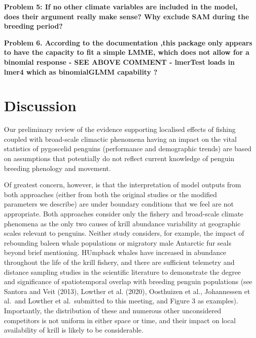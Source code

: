 \documentclass[]{elsarticle} %
\begin{document}
\textbf{Problem 5: If no other climate variables are included in the
model, does their argument really make sense? Why exclude SAM during the
breeding period?}

\textbf{Problem 6. According to the documentation ,this package only
appears to have the capacity to fit a simple LMME, which does not allow
for a binomial response - SEE ABOVE COMMENT - lmerTest loads in lmer4
which as binomialGLMM capability ?}

\hypertarget{discussion}{%
\section{Discussion}\label{discussion}}

Our preliminary review of the evidence supporting localised effects of
fishing coupled with broad-scale climactic phenomena having an impact on
the vital statistics of pygoscelid penguins (performance and demographic
trends) are based on assumptions that potentially do not reflect current
knowledge of penguin breeding phenology and movement.

Of greatest concern, however, is that the interpretation of model
outputs from both approaches (either from both the original studies or
the modified parameters we describe) are under boundary conditions that
we feel are not appropriate. Both approaches consider only the fishery
and broad-scale climate phenomena as the only two causes of krill
abundance variability at geographic scales relevant to penguins. Neither
study considers, for example, the impact of rebounding baleen whale
populations or migratory male Antarctic fur seals beyond brief
mentioning. HUmpback whales have increased in abundance throughout the
life of the krill fishery, and there are sufficient telemetry and
distance sampling studies in the scientific literature to demonstrate
the degree and significance of spatiotemporal overlap with breeding
penguin populations (see Santora and Veit (2013), Lowther et al. (2020),
Oosthuizen et al., Johannessen et al.~and Lowther et al.~submitted to
this meeting, and Figure 3 as examples). Importantly, the distribution
of these and numerous other unconsidered competitors is not uniform in
either space or time, and their impact on local availability of krill is
likely to be considerable.
\end{document}
